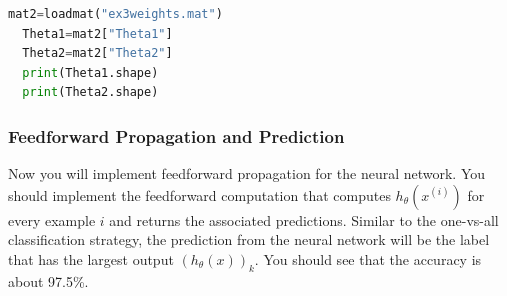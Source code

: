 \documentclass[12pt]{article}
\begin{document}
\begin{lstlisting}[language=Python]
  mat2=loadmat("ex3weights.mat")
  Theta1=mat2["Theta1"]
  Theta2=mat2["Theta2"]
  print(Theta1.shape)
  print(Theta2.shape)
\end{lstlisting}

\subsubsection{Feedforward Propagation and Prediction}

Now you will implement feedforward propagation for the neural network. You should implement the feedforward computation that computes $h_\theta(x^{(i)})$ for every example $i$ and returns the associated predictions. Similar to the one-vs-all classification strategy, the prediction from the neural network will be the label that has the largest output $(h_\theta(x))_k$. You should see that the accuracy is about 97.5\%. 

\end{document}
